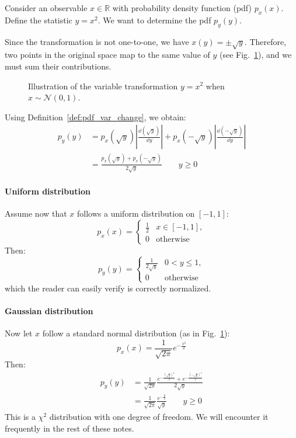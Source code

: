\begin{example}
	Consider an observable $x \in \mathbb{R}$ with probability density function (pdf) $p_x(x)$. Define the statistic $y = x^2$. We want to determine the pdf $p_y(y)$.

	Since the transformation is not one-to-one, we have $x(y) = \pm \sqrt{y}$. Therefore, two points in the original space map to the same value of $y$ (see Fig.~\ref{fig:variable_change}), and we must sum their contributions.
	
	\begin{figure}[H]
		\centering
		
		\caption{Illustration of the variable transformation $y = x^2$ when $x \sim \mathcal{N}(0, 1)$.}
		\label{fig:variable_change}
	\end{figure}
	
	Using Definition~\ref{def:pdf_var_change}, we obtain:
	\begin{align*}
		p_y(y)&=
		p_x(\sqrt{y})\left|\frac{\dd (\sqrt{y})}{\dd y}\right|
		+
		p_x({\scriptstyle -}\sqrt{y})\left|\frac{\dd ({\scriptstyle -}\sqrt{y})}{\dd y}\right|\\
		&=\frac{p_x(\sqrt{y})+p_x({\scriptstyle -}\sqrt{y})}{2\sqrt{y}} \qquad y \ge 0
	\end{align*}
	
	\paragraph{Uniform distribution}
	
	Assume now that $x$ follows a uniform distribution on $[-1,1]$:
	\[
	p_x(x)=
	\begin{cases}
		\frac{1}{2} & x \in [-1,1],\\
		0 & \text{otherwise}
	\end{cases}
	\]
	Then:
	\[
	p_y(y)=
	\begin{cases}
		\frac{1}{2\sqrt{y}} & 0 < y \le 1,\\
		0 & \text{otherwise}
	\end{cases}
	\]
	which the reader can easily verify is correctly normalized.
	
	\paragraph{Gaussian distribution}
	Now let $x$ follow a standard normal distribution (as in Fig.~\ref{fig:variable_change}):
	\[
	p_x(x)=\frac{1}{\sqrt{2\pi}} e^{-\frac{x^2}{2}}
	\]
	Then:
	\begin{align*}
		p_y(y)&=\frac{1}{\sqrt{2\pi}}\frac{e^{-\frac{(\sqrt{y})^2}{2}}+e^{-\frac{({\scriptstyle -}\sqrt{y})^2}{2}}}{2 \sqrt{y}}\\
		&=\frac{1}{\sqrt{2\pi}}\frac{e^{-\frac{y}{2}}}{\sqrt{y}} \qquad y \ge 0
	\end{align*}
	This is a $\chi^2$ distribution with one degree of freedom. We will encounter it frequently in the rest of these notes.

\end{example}


